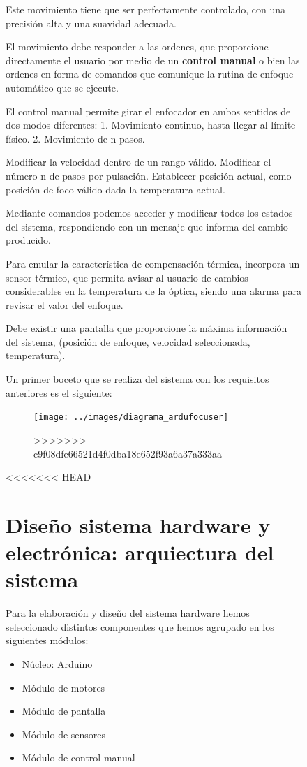 \begin{figure}[h]
Este movimiento tiene que ser perfectamente controlado, con una precisión alta y una suavidad adecuada. 

El movimiento debe responder a las ordenes, que proporcione directamente el usuario por medio de un \textbf{control manual} o bien las ordenes en forma de comandos  que comunique la rutina de enfoque automático que se ejecute.

El control manual permite girar el enfocador en ambos sentidos de dos modos diferentes:
    1. Movimiento continuo, hasta llegar al límite físico.
    2. Movimiento de n pasos.

Modificar la velocidad dentro de un rango válido.
Modificar el número n de pasos por pulsación. 
Establecer posición actual, como posición de foco válido dada la temperatura actual. 
 
Mediante comandos podemos acceder y modificar todos los estados del sistema, respondiendo con un mensaje que informa del cambio producido. 

Para emular la característica de compensación térmica, incorpora un sensor térmico, que permita avisar al usuario de cambios considerables en la temperatura de la óptica, siendo una alarma para revisar el valor del enfoque.  

Debe existir una pantalla que proporcione la máxima información del sistema, (posición de enfoque, velocidad seleccionada, temperatura).


Un primer boceto que se realiza del sistema con los requisitos anteriores es el siguiente:

\begin{figure}[h]
\centering
\texttt{[image: ../images/diagrama\_ardufocuser]}
\caption{}
>>>>>>> c9f08dfe66521d4f0dba18e652f93a6a37a333aa
\label{fig:diagrama_ardufocuser}
\end{figure}


<<<<<<< HEAD
\section{Diseño sistema hardware y electrónica: arquiectura del sistema}

Para la elaboración y diseño del sistema hardware hemos seleccionado distintos componentes que hemos agrupado en los siguientes módulos:

\begin{itemize}
 \item Núcleo: Arduino
 \item Módulo de motores
 \item Módulo de pantalla
 \item Módulo de sensores
 \item Módulo de control manual
\end{itemize}


\end{figure}
